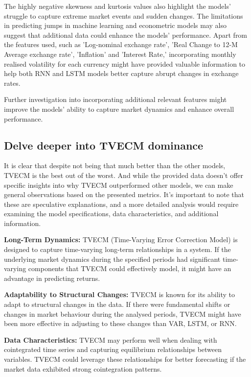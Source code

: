 \documentclass[a4paper,10pt]{article}
\begin{document}
The highly negative skewness and kurtosis values also highlight the models' struggle to capture extreme market events and sudden changes. The limitations in predicting jumps in machine learning and econometric models may also suggest that additional data could enhance the models' performance. Apart from the features used, such as 'Log-nominal exchange rate', 'Real Change to 12-M Average exchange rate', 'Inflation' and 'Interest Rate,' incorporating monthly realised volatility for each currency might have provided valuable information to help both RNN and LSTM models better capture abrupt changes in exchange rates.

Further investigation into incorporating additional relevant features might improve the models' ability to capture market dynamics and enhance overall performance.

\subsection{Delve deeper into TVECM dominance}

It is clear that despite not being that much better than the other models, TVECM is the best out of the worst. And while the provided data doesn't offer specific insights into why TVECM outperformed other models, we can make general observations based on the presented metrics. It's important to note that these are speculative explanations, and a more detailed analysis would require examining the model specifications, data characteristics, and additional information.

\textbf{Long-Term Dynamics:} TVECM (Time-Varying Error Correction Model) is designed to capture time-varying long-term relationships in a system. If the underlying market dynamics during the specified periods had significant time-varying components that TVECM could effectively model, it might have an advantage in predicting returns.

\textbf{Adaptability to Structural Changes:} TVECM is known for its ability to adapt to structural changes in the data. If there were fundamental shifts or changes in market behaviour during the analysed periods, TVECM might have been more effective in adjusting to these changes than VAR, LSTM, or RNN.

\textbf{Data Characteristics:} TVECM may perform well when dealing with cointegrated time series and capturing equilibrium relationships between variables. TVECM could leverage these relationships for better forecasting if the market data exhibited strong cointegration patterns.
\end{document}
